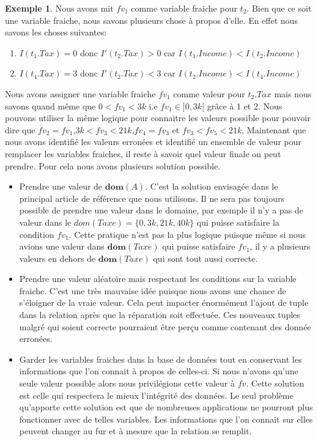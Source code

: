 \documentclass[letterpaper, 12pt]{report}
\theoremstyle{definition}
\newtheorem{myexample}{Exemple}
\newcommand{\dom}{\mathbf{dom}}
\begin{document}
\begin{myexample}
Nous avons mit $fv_1$ comme variable fraiche pour $t_2$. Bien que ce soit une variable fraiche, nous savons plusieurs chose à propos d'elle. En effet nous savons les choses suivantes:
\begin{enumerate}

\item $I(t_1.Tax)=0$ donc $I'(t_2.Tax)>0$ car $I(t_1.Income)<I(t_2.Income)$
\item $I(t_4.Tax)=3$ donc $I'(t_2.Tax)<3$ car $I(t_2.Income)<I(t_4.Income)$

\end{enumerate}

Nous avons assigner une variable fraiche $fv_1$ comme valeur pour $t_2.Tax$ mais nous savons quand même que $0<fv_1<3k$ i.e $fv_1 \in ]0,3k[$ grâce à 1 et 2. Nous pouvons utiliser la même logique pour connaitre les valeurs possible pour pouvoir dire que $fv_2 = fv_1$,$3k<fv_3<21k$,$fv_4 = fv_3$ et $fv_3<fv_5<21k$. Maintenant que nous avons identifié les valeurs erronées et identifié un ensemble de valeur pour remplacer les variables fraiches, il reste à savoir quel valeur finale on peut prendre. Pour cela nous avons plusieurs solution possible.\\
\begin{itemize}
	\item Prendre une valeur de $\dom(A)$. C'est la solution envisagée dans le principal article de référence que nous utilisons. Il ne sera pas toujours possible de prendre une valeur dans le domaine, par exemple il n'y a pas de valeur dans le $dom(Taxe)= \{0,3k,21k,40k\}$ qui puisse satisfaire la condition $fv_1$. Cette pratique n'est pas la plus logique puisque même si nous avions une valeur dans $\dom(Taxe)$ qui puisse satisfaire $fv_1$, il y a plusieurs valeurs en dehors de $\dom(Taxe)$ qui sont tout aussi correcte.
	\item Prendre une valeur aléatoire mais respectant les conditions sur la variable fraiche. C'est une très mauvaise idée puisque nous avons une chance de s'éloigner de la vraie valeur. Cela peut impacter énormément l'ajout de tuple dans la relation après que la réparation soit effectuée. Ces nouveaux tuples malgré qui soient correcte pourraient être perçu comme contenant des donnée erronées.
	\item Garder les variables fraiches dans la base de données tout en conservant les informations que l'on connait à propos de celles-ci. Si nous n'avons qu'une seule valeur possible alors nous privilégions cette valeur à $fv$. Cette solution est celle qui respectera le mieux l'intégrité des données. Le seul problème qu'apporte cette solution est que de nombreuses applications ne pourront plus fonctionner avec de telles variables. Les informations que l'on connait sur elles peuvent changer au fur et à mesure que la relation se remplit.
\end{itemize}


\end{myexample}
\end{document}
